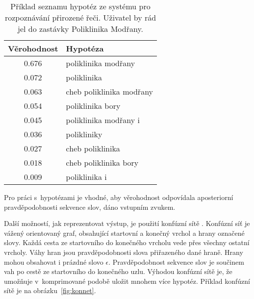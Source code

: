 \begin{table}[h]
\begin{center}
\begin{tabular}{|c|l|}
\hline
Věrohodnost & Hypotéza \\
\hline
\hline
0.676 & poliklinika modřany\\
\hline
0.072 & poliklinika\\
\hline
0.063 & cheb poliklinika modřany\\
\hline
0.054 & poliklinika bory\\
\hline
0.045 & poliklinika modřany i\\
\hline
0.036 & polikliniky\\
\hline
0.027 & cheb poliklinika\\
\hline
0.018 & cheb poliklinika bory\\
\hline
0.009 & poliklinika i\\
\hline
\end{tabular}
\end{center}
\caption{Příklad seznamu hypotéz ze systému pro rozpoznávání přirozené řeči.
Uživatel by rád jel do zastávky Poliklinika Modřany.}
\label{tab:sezhyp}
\end{table}

Pro práci s~hypotézami je vhodné, aby věrohodnost odpovídala aposteriorní pravděpodobnosti sekvence slov, dáno vstupním zvukem.

Další možností, jak reprezentovat výstup, je použití konfúzní sítě \cite{bertoldi2005new}.
Konfúzní síť je vážený orientovaný graf, obsahující startovní a konečný vrchol a hrany označené slovy.
Každá cesta ze startovního do konečného vrcholu vede přes všechny ostatní vrcholy.
Váhy hran jsou pravděpodobnosti slova přiřazeného dané hraně.
Hrany mohou obsahovat i prázdné slovo $\epsilon$.
Pravděpodobnost sekvence slov je součinem vah po cestě ze startovního do konečného uzlu.
Výhodou konfúzní sítě je, že umožňuje v~komprimované podobě uložit mnohem více hypotéz.
Příklad konfúzní sítě je na obrázku~\ref{fig:konnet}.

